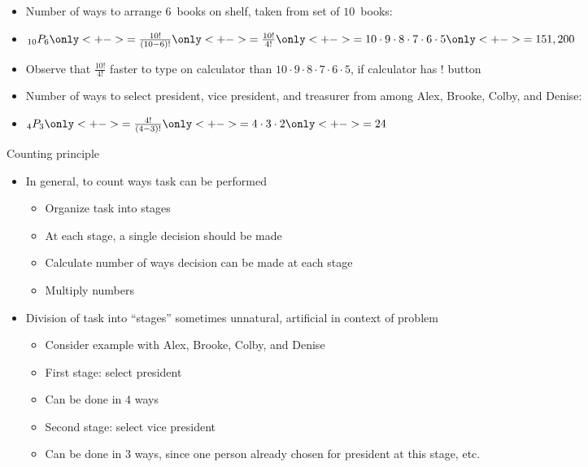 \documentclass[handout]{beamer}
\theoremstyle{definition}
\begin{document}
\begin{frame}
\begin{example}
\begin{itemize}
\item Number of ways to arrange $6$~books
on shelf, taken from set of $10$~books:
\item $_{10}P_6
\only<+->{=\frac{10!}{\left(10-6\right)!}}
\only<+->{=\frac{10!}{4!}}
\only<+->{=10\cdot 9\cdot 8\cdot 7\cdot 6\cdot 5}
\only<+->{=151,200}$
\item Observe that $\frac{10!}{4!}$ faster to type
on calculator than 
$10\cdot 9\cdot 8\cdot 7\cdot 6\cdot 5$, if calculator
has \alert{$!$} button
\end{itemize}
\end{example}
\begin{example}
\begin{itemize}
\item Number of ways to select president, vice president,
and treasurer from among Alex, Brooke, Colby, and Denise:
\item $_4P_3
\only<+->{=\frac{4!}{\left(4-3\right)!}}
\only<+->{=4\cdot 3\cdot 2}
\only<+->{=24}$
\end{itemize}
\end{example}
\end{frame}

\begin{frame}{Counting principle}
\begin{itemize}
\item In general, to count ways task can be performed
\begin{itemize}
\item Organize task into stages
\item At each stage, a single decision should be made
\item Calculate number of ways decision can
be made at each stage
\item Multiply numbers
\end{itemize}
\item Division of task into ``stages'' sometimes unnatural,
artificial in context of problem
\begin{example}
\begin{itemize}
\item Consider example with Alex, Brooke, Colby, and Denise
\item First stage: select president
\item Can be done in $4$ ways
\item Second stage: select vice president
\item Can be done in $3$ ways, since one person already
chosen for president at this stage, etc.
\end{itemize}
\end{example}
\end{itemize}
\end{frame}
\end{document}
